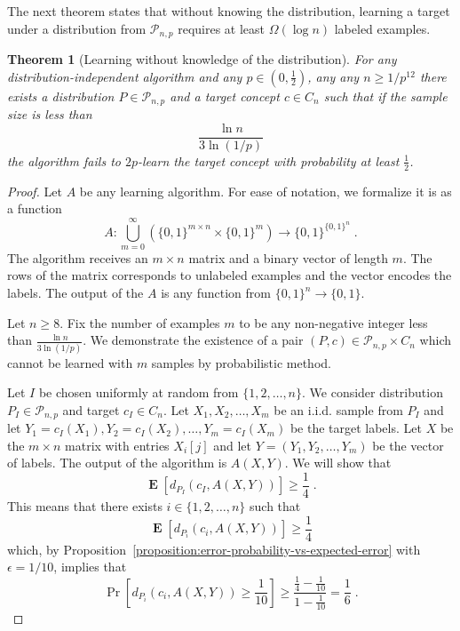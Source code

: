 \documentclass[10pt]{article}
\newtheorem{theorem}[proposition]{Theorem}
\renewcommand{\P}{\mathcal{P}}
\DeclareMathOperator{\Exp}{\mathbf{E}}
\begin{document}
The next theorem states that without knowing the distribution,
learning a target under a distribution from $\P_{n,p}$ 
requires at least $\Omega(\log n)$ labeled examples.

\begin{theorem}[Learning without knowledge of the distribution]
For any distribution-independent algorithm and any $p \in (0,\frac{1}{2})$,
any any $n \ge 1/p^{12}$
there exists a distribution $P \in \P_{n,p}$ and a target
concept $c \in C_n$ such that if the sample size is less than
$$
\frac{\ln n}{3 \ln (1/p)}
$$
the algorithm fails to $2p$-learn the
target concept with probability at least $\frac{1}{2}$.
\end{theorem}

\begin{proof}
Let $A$ be any learning algorithm. For ease of notation, we formalize it is as a function
$$
A:\bigcup_{m=0}^\infty \left(\{0,1\}^{m \times n} \times \{0,1\}^m\right) \to \{0,1\}^{\{0,1\}^n} \; .
$$
The algorithm receives an $m \times n$ matrix and a binary vector of length $m$.
The rows of the matrix corresponds to unlabeled examples and the vector encodes
the labels. The output of the $A$ is any function from $\{0,1\}^n \to \{0,1\}$.

Let $n \ge 8$. Fix the number of examples $m$ to be any non-negative integer less than
$\frac{\ln n}{3 \ln(1/p)}$. We demonstrate the existence of a pair $(P,c) \in
\P_{n,p} \times C_n$ which cannot be learned with $m$ samples by probabilistic method.

Let $I$ be chosen uniformly at random from $\{1,2,\dots,n\}$. We consider distribution
$P_I \in \P_{n,p}$ and target $c_I \in C_n$. Let $X_1, X_2, \dots, X_m$ be an
i.i.d. sample from $P_I$ and let $Y_1 = c_I(X_1), Y_2 = c_I(X_2), \dots, Y_m =
c_I(X_m)$ be the target labels. Let $X$ be the $m \times n$ matrix with entries
$X_i[j]$ and let $Y = (Y_1, Y_2, \dots, Y_m)$ be the vector of labels. The
output of the algorithm is $A(X,Y)$. We will show that
\begin{equation}
\label{equation:failure-probability}
\Exp \left[d_{P_I}(c_I, A(X,Y)) \right] \ge \frac{1}{4} \; .
\end{equation}
This means that there exists $i \in \{1,2,\dots,n\}$ such that
$$
\Exp \left[d_{P_i}(c_i, A(X,Y)) \right] \ge \frac{1}{4}
$$
which, by Proposition~\ref{proposition:error-probability-vs-expected-error} with $\epsilon=1/10$, implies that
$$
\Pr \left[ d_{P_i}(c_i, A(X,Y)) \ge \frac{1}{10} \right] \ge \frac{\frac{1}{4} - \frac{1}{10}}{1 - \frac{1}{10}} = \frac{1}{6} \; .
$$


\end{proof}
\end{document}
